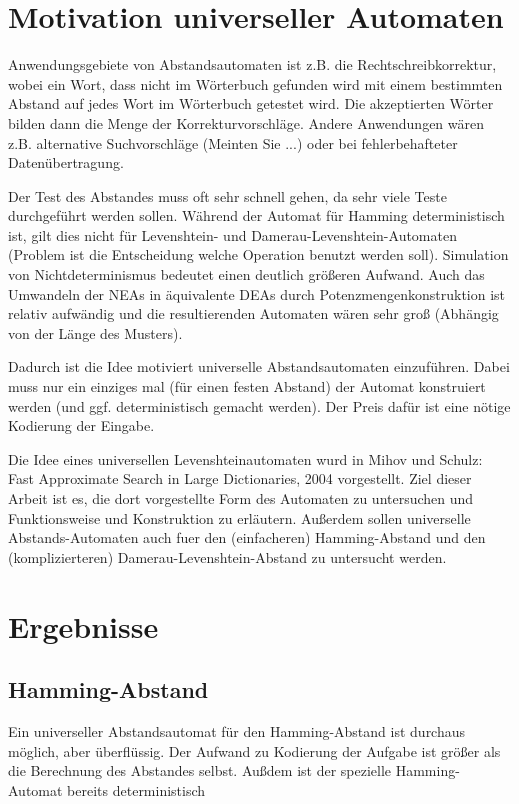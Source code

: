 \section{Motivation universeller Automaten}
Anwendungsgebiete von Abstandsautomaten ist z.B. die Rechtschreibkorrektur, wobei ein Wort, dass nicht im Wörterbuch gefunden wird mit einem bestimmten Abstand auf jedes Wort im Wörterbuch getestet wird. Die akzeptierten Wörter bilden dann die Menge der Korrekturvorschläge. Andere Anwendungen wären z.B. alternative Suchvorschläge (\glqq Meinten Sie ...\grqq) oder bei fehlerbehafteter Datenübertragung.

Der Test des Abstandes muss oft sehr schnell gehen, da sehr viele Teste durchgeführt werden sollen. Während der Automat für Hamming deterministisch ist, gilt dies nicht für Levenshtein- und Damerau-Levenshtein-Automaten (Problem ist die Entscheidung welche Operation benutzt werden soll). Simulation von Nichtdeterminismus bedeutet einen deutlich größeren Aufwand. Auch das Umwandeln der NEAs in äquivalente DEAs durch Potenzmengenkonstruktion ist relativ aufwändig und die resultierenden Automaten wären sehr groß (Abhängig von der Länge des Musters).

Dadurch ist die Idee motiviert universelle Abstandsautomaten einzuführen. Dabei muss nur ein einziges mal (für einen festen Abstand) der Automat konstruiert werden (und ggf. deterministisch gemacht werden). Der Preis dafür ist eine nötige Kodierung der Eingabe.

Die Idee eines universellen Levenshteinautomaten wurd in Mihov und Schulz: Fast Approximate Search in Large Dictionaries, 2004 vorgestellt. Ziel dieser Arbeit ist es, die dort vorgestellte Form des Automaten zu untersuchen und Funktionsweise und Konstruktion zu erläutern. Außerdem sollen universelle Abstands-Automaten auch fuer den (einfacheren) Hamming-Abstand und den (komplizierteren) Damerau-Levenshtein-Abstand zu untersucht werden.
\section{Ergebnisse}
\subsection{Hamming-Abstand}
Ein universeller Abstandsautomat für den Hamming-Abstand ist durchaus möglich, aber überflüssig. Der Aufwand zu Kodierung der Aufgabe ist größer als die Berechnung des Abstandes selbst. Außdem ist der spezielle Hamming-Automat bereits deterministisch

